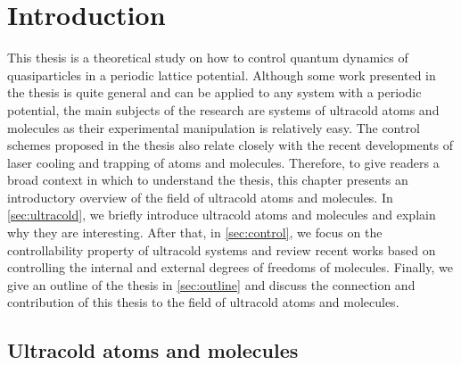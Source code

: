 
\chapter{Introduction}
\label{ch:Introduction}

This thesis is a theoretical study on how to control quantum dynamics of quasiparticles in a periodic lattice potential. 
Although some work presented in the thesis is quite general and can be applied to any system with a periodic potential, 
the main subjects of the research are systems of ultracold atoms and molecules as their experimental manipulation is 
relatively easy. The control schemes proposed in the thesis also relate closely with the recent developments of laser 
cooling and trapping of atoms and molecules. Therefore, to give readers a broad context in which to understand the 
thesis, this chapter presents an introductory overview of the field of ultracold atoms and molecules. In \autoref{sec:ultracold}, we briefly introduce ultracold atoms and molecules and explain why they are interesting. After
that, in \autoref{sec:control}, we focus on the controllability property of ultracold systems and review recent works 
based on controlling the internal and external degrees of freedoms of  molecules. 
Finally, we give an outline of the thesis in \autoref{sec:outline} and discuss the connection and contribution of  
this thesis to the field of ultracold atoms and molecules. 

\section{Ultracold atoms and molecules}
\label{sec:ultracold}

